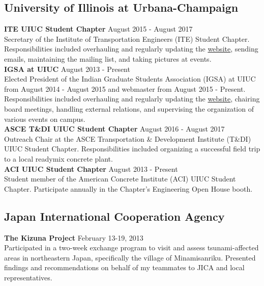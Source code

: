 \documentclass[12pt]{article}
\begin{document}
\subsection*{University of Illinois at Urbana-Champaign} 
\textbf{ITE UIUC Student Chapter} \hfill August 2015 - August 2017 \\
Secretary of the Institute of Transportation Engineers (ITE) Student Chapter. Responsibilities included overhauling and regularly updating the \href{https://iteuiuc.wordpress.com/}{website}, sending emails, maintaining the mailing list, and taking pictures at events. \\

\textbf{IGSA at UIUC} \hfill August 2013 - Present \\
Elected President of the Indian Graduate Students Association (IGSA) at UIUC from August 2014 - August 2015 and webmaster from August 2015 - Present. Responsibilities included overhauling and regularly updating the \href{http://igsauiuc.com/?i=1}{website}, chairing board meetings, handling external relations, and supervising the organization of various events on campus. \\

\textbf{ASCE T\&DI UIUC Student Chapter} \hfill August 2016 - August 2017 \\
Outreach Chair at the ASCE Transportation \& Development Institute (T\&DI) UIUC Student Chapter. Responsibilities included organizing a successful field trip to a local readymix concrete plant. \\

\textbf{ACI UIUC Student Chapter} \hfill August 2013 - Present \\
Student member of the American Concrete Institute (ACI) UIUC Student Chapter. Participate annually in the Chapter's Engineering Open House booth. \\

\subsection*{Japan International Cooperation Agency}
\textbf{The Kizuna Project} \hfill February 13-19, 2013\\
Participated in a two-week exchange program to visit and assess tsunami-affected areas in northeastern Japan, specifically the village of Minamisanriku. Presented findings and recommendations on behalf of my teammates to JICA and local representatives. \\
\end{document}
